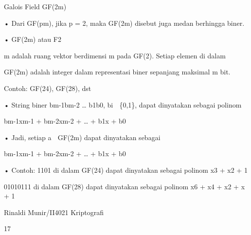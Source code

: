 \documentclass{article}
\begin{document}

Galois Field GF(2m)

• Dari GF(pm), jika p = 2, maka GF(2m) disebut juga medan berhingga biner.  

• GF(2m) atau F2

m adalah ruang vektor berdimensi m pada GF(2).  Setiap elemen di dalam 

GF(2m) adalah integer dalam representasi biner sepanjang maksimal m bit. 

    Contoh: GF(24), GF(28), dst 

• String biner bm-1bm-2 … b1b0,  bi  \{0,1\}, dapat dinyatakan sebagai polinom

            bm-1xm-1 + bm-2xm-2 + … + b1x + b0

• Jadi, setiap a  GF(2m) dapat dinyatakan sebagai 


 bm-1xm-1 + bm-2xm-2 + … + b1x + b0 

• Contoh:  1101  di dalam GF(24) dapat dinyatakan sebagai polinom x3 + x2 + 1 

                    01010111 di dalam GF(28) dapat dinyatakan sebagai polinom x6 + x4 + x2 + x + 1 

Rinaldi Munir/II4021 Kriptografi

17
\end{document}

